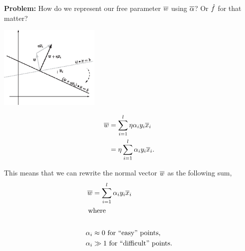 \documentclass[a4paper,blends,pdf,colorBG,slideColor]{prosper}
\begin{document}
\begin{center}
\end{center}
{\bf Problem:} How do we represent our free parameter $\overline{w}$ using $\overline{\alpha}$? Or $\hat{f}$
for that matter?
\es


\begin{center}
\includegraphics[height=40mm]{figures/fig05-02.eps}
\end{center}

\begin{align*}
\overline{w} &= \sum_{i=1}^l \eta\alpha_i y_i \overline{x}_i\\
	 &= \eta \sum_{i=1}^l \alpha_i y_i \overline{x}_i.
\end{align*}

\es

This means that we can rewrite
the normal vector $\overline{w}$ as the following sum,
\begin{align*}
\overline{w} &= \sum_{i=1}^l \alpha_i y_i \overline{x}_i\\
\intertext{ where }\\
\alpha_i &\approx 0 \mbox{ for ``easy'' points,}\\
\alpha_i &\gg 1 \mbox{ for ``difficult'' points.}
\end{align*}
\end{document}
